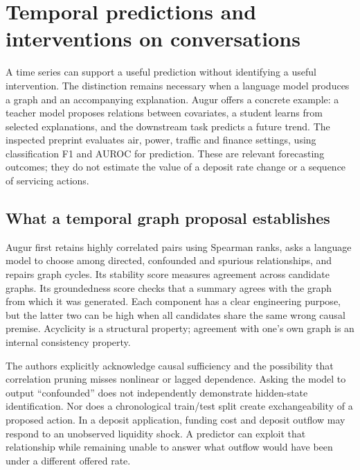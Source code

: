 \hypertarget{temporal-predictions-and-interventions-on-conversations}{%
\section{Temporal predictions and interventions on
conversations}\label{temporal-predictions-and-interventions-on-conversations}}

\label{exec13:census-temporal}

A time series can support a useful prediction without identifying a
useful intervention. The distinction remains necessary when a language
model produces a graph and an accompanying explanation. Augur offers a
concrete example: a teacher model proposes relations between covariates,
a student learns from selected explanations, and the downstream task
predicts a future trend. The inspected preprint evaluates air, power,
traffic and finance settings, using classification F1 and AUROC for
prediction. These are relevant forecasting outcomes; they do not
estimate the value of a deposit rate change or a sequence of servicing
actions. \citep{exec13_census_augur_arxiv}

\hypertarget{what-a-temporal-graph-proposal-establishes}{%
\subsection{What a temporal graph proposal
establishes}\label{what-a-temporal-graph-proposal-establishes}}

Augur first retains highly correlated pairs using Spearman ranks, asks a
language model to choose among directed, confounded and spurious
relationships, and repairs graph cycles. Its stability score measures
agreement across candidate graphs. Its groundedness score checks that a
summary agrees with the graph from which it was generated. Each
component has a clear engineering purpose, but the latter two can be
high when all candidates share the same wrong causal premise. Acyclicity
is a structural property; agreement with one's own graph is an internal
consistency property. \citep{exec13_census_augur_arxiv}

The authors explicitly acknowledge causal sufficiency and the
possibility that correlation pruning misses nonlinear or lagged
dependence. Asking the model to output ``confounded'' does not
independently demonstrate hidden-state identification. Nor does a
chronological train/test split create exchangeability of a proposed
action. In a deposit application, funding cost and deposit outflow may
respond to an unobserved liquidity shock. A predictor can exploit that
relationship while remaining unable to answer what outflow would have
been under a different offered rate.

